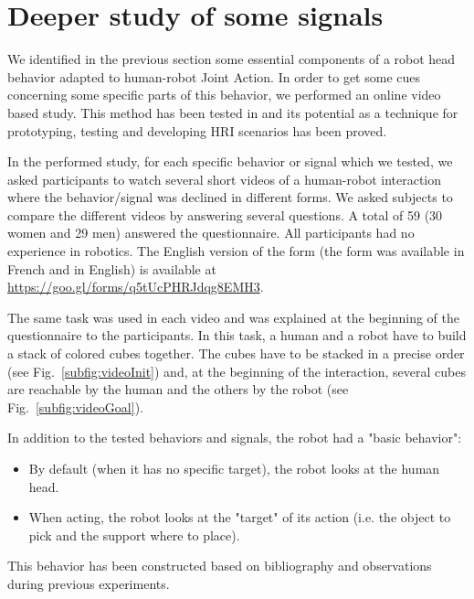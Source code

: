 \documentclass[english,a4paper,11pt,twoside]{StyleThese}
\begin{document}
\section{Deeper study of some signals}

We identified in the previous section some essential components of a robot head behavior adapted to human-robot Joint Action. In order to get some cues concerning some specific parts of this behavior, we performed an online video based study. This method has been tested in \cite{woods2006comparing} and its potential as a technique for prototyping, testing and developing HRI scenarios has been proved.

In the performed study, for each specific behavior or signal which we tested, we asked participants to watch several short videos of a human-robot interaction where the behavior/signal was declined in different forms. We asked subjects to compare the different videos by answering several questions. A total of 59 (30 women and 29 men) answered the questionnaire. All participants had no experience in robotics. The English version of the form (the form was available in French and in English) is available at \url{https://goo.gl/forms/q5tUcPHRJdqg8EMH3}.

The same task was used in each video and was explained at the beginning of the questionnaire to the participants. In this task, a human and a robot have to build a stack of colored cubes together. The cubes have to be stacked in a precise order (see Fig.~\ref{subfig:videoInit}) and, at the beginning of the interaction, several cubes are reachable by the human and the others by the robot (see Fig.~\ref{subfig:videoGoal}). 

In addition to the tested behaviors and signals, the robot had a "basic behavior":
\begin{itemize}
\item By default (when it has no specific target), the robot looks at the human head. 
\item When acting, the robot looks at the "target" of its action (i.e. the object to pick and the support where to place).
\end{itemize}
This behavior has been constructed based on bibliography and observations during previous experiments.
\end{document}
